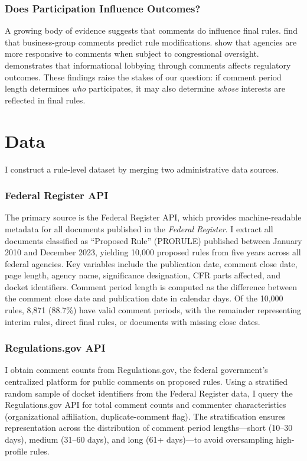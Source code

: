 \documentclass[12pt]{article}
\begin{document}
\subsubsection*{Does Participation Influence Outcomes?} A growing body of evidence suggests that comments do influence final rules. \citet{yackee2006assessing} find that business-group comments predict rule modifications. \citet{gordon2020watching} show that agencies are more responsive to comments when subject to congressional oversight. \citet{libgober2020informational} demonstrates that informational lobbying through comments affects regulatory outcomes. These findings raise the stakes of our question: if comment period length determines \textit{who} participates, it may also determine \textit{whose} interests are reflected in final rules.

\section{Data}
\label{sec:data}

I construct a rule-level dataset by merging two administrative data sources.

\subsubsection*{Federal Register API} The primary source is the Federal Register API, which provides machine-readable metadata for all documents published in the \textit{Federal Register}. I extract all documents classified as ``Proposed Rule'' (PRORULE) published between January 2010 and December 2023, yielding 10,000 proposed rules from five years across all federal agencies. Key variables include the publication date, comment close date, page length, agency name, significance designation, CFR parts affected, and docket identifiers. Comment period length is computed as the difference between the comment close date and publication date in calendar days. Of the 10,000 rules, 8,871 (88.7\%) have valid comment periods, with the remainder representing interim rules, direct final rules, or documents with missing close dates.

\subsubsection*{Regulations.gov API} I obtain comment counts from Regulations.gov, the federal government's centralized platform for public comments on proposed rules. Using a stratified random sample of docket identifiers from the Federal Register data, I query the Regulations.gov API for total comment counts and commenter characteristics (organizational affiliation, duplicate-comment flag). The stratification ensures representation across the distribution of comment period lengths---short (10--30 days), medium (31--60 days), and long (61+ days)---to avoid oversampling high-profile rules.
\end{document}
